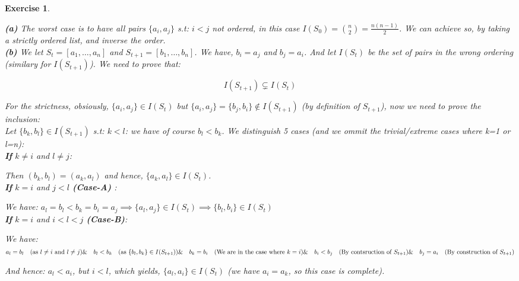 \documentclass{article}
\newtheorem{exo}{Exercise}
\begin{document}
\begin{exo}{\ \\}


\noindent
\textbf{(a)} The worst case is to have all pairs $\{a_i,a_j\}$ s.t: $i<j$ not ordered, in this case $I(S_0) = \binom{n}{2} = \frac{n(n-1)}{2}$. We can achieve so, by taking a strictly ordered list, and inverse the order. \\

\noindent
\textbf{(b)} We let $S_t = [a_1, \dots, a_n]$ and $S_{t+1} = [b_1, \dots, b_n]$. We have, $b_i = a_j$ and $b_j = a_i$. And let $I(S_t)$ be the set of pairs in the wrong ordering (similary for $I(S_{t+1})$). We need to prove that:

\[ I(S_{t+1}) \subsetneq  I(S_{t}) \]

For the strictness, obsiously, $\{a_i, a_j\} \in I(S_t)$ but $\{a_i, a_j\} = \{b_j, b_i\} \notin I(S_{t+1})$ (by definition of $S_{t+1}$), now we need to prove the inclusion: \\

Let $\{b_k, b_l\} \in I(S_{t+1})$ s.t: $k < l$: we have of course $b_l < b_k$. We distinguish 5 cases (and we ommit the trivial/extreme cases where k=1 or l=n):\\

\textbf{If} $k \neq i$ and $l \neq j$:

\noindent
Then $(b_k, b_l) = (a_k, a_l)$ and hence, $\{a_k, a_l\} \in I(S_t)$. \\

\textbf{If} $k=i$ and $j < l$ \textbf{(Case-A)} :

\noindent
We have:  $
a_l = b_l < b_k = b_i = a_j 
\implies \{a_l, a_j\} \in I(S_{t}) 
\implies \{b_l, b_i\} \in I(S_{t})
$ \\

\textbf{If} $k=i$ and $i <  l < j$ \textbf{(Case-B)}:

\noindent We have:
$
a_l = b_l \quad \text{(as $l \neq i$ and $l \neq j$)}\\
\& \quad b_l < b_k  \quad \text{(as $\{b_l, b_k\}\in I(S_{t+1})$)}\\  
\& \quad b_k = b_i \quad \text{(We are in the case where $k = i$)}\\
\& \quad b_i < b_j \quad \text{(By contsruction of $S_{t+1}$)}\\
\& \quad b_j=  a_i \quad \text{(By construction of $S_{t+1}$)}\\ 
$ 

And hence: $a_l < a_i$, but $i<l$, which yields, $\{a_l, a_i\} \in I(S_{t})$ (we have $a_i = a_k$, so this case is complete). \\


\end{exo}
\end{document}
